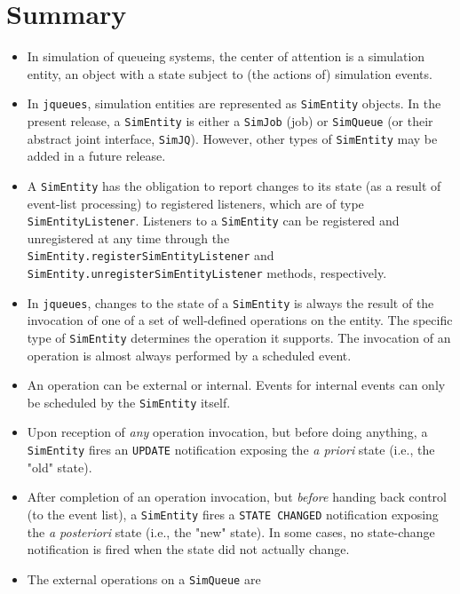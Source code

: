 \section{Summary}

\begin{itemize}
	\item In simulation of queueing systems,
	the center of attention is a simulation entity,
	an object with a state subject to (the actions of) simulation events.
	\item In \lstinline|jqueues|, simulation entities are represented
	as \lstinline|SimEntity| objects.
	In the present release,
	a \lstinline|SimEntity| is either a \lstinline|SimJob|
	(job) or \lstinline|SimQueue| (or their abstract joint interface,
	\lstinline|SimJQ|).
	However, other types of \lstinline|SimEntity| may be added in a future release.
	\item A \lstinline|SimEntity| has the obligation to report
	changes to its state (as a result of event-list processing)
	to registered listeners,
	which are of type \lstinline|SimEntityListener|.
	Listeners to a \lstinline|SimEntity| can be registered and
	unregistered at any time through the
	\lstinline|SimEntity.registerSimEntityListener|
	and \lstinline|SimEntity.unregisterSimEntityListener|
	methods, respectively.
	\item In \lstinline|jqueues|, changes to the state
	of a \lstinline|SimEntity| is always the result
	of the invocation of one of a set of well-defined
	operations on the entity.
	The specific type of \lstinline|SimEntity|
	determines the operation it supports.
	The invocation of an operation is
	almost always performed by a scheduled event.
	\item An operation can be external or internal.
	Events for internal events can only be scheduled
	by the \lstinline|SimEntity| itself.
	\item Upon reception of {\em any\/} operation invocation,
	but before doing anything,
	a \lstinline|SimEntity| fires an \lstinline|UPDATE|
	notification exposing the {\em a priori\/} state
	(i.e., the "old" state).
	\item After completion of an operation invocation,
	but {\em before\/} handing back control (to the event list),
	a \lstinline|SimEntity| fires a \lstinline|STATE CHANGED|
	notification exposing the {\em a posteriori\/} state
	(i.e., the "new" state).
	In some cases, no state-change notification is fired when
	the state did not actually change.
	\item The external operations on a \lstinline|SimQueue| are

\end{itemize}
